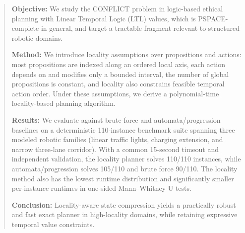 \documentclass[]{jair}
\begin{document}
\begin{abstract}
\textbf{Objective:} We study the CONFLICT problem in logic-based ethical planning with Linear Temporal Logic (LTL) values, which is PSPACE-complete in general, and target a tractable fragment relevant to structured robotic domains.

\textbf{Method:} We introduce locality assumptions over propositions and actions: most propositions are indexed along an ordered local axis, each action depends on and modifies only a bounded interval, the number of global propositions is constant, and locality also constrains feasible temporal action order. Under these assumptions, we derive a polynomial-time locality-based planning algorithm.

\textbf{Results:} We evaluate against brute-force and automata/progression baselines on a deterministic 110-instance benchmark suite spanning three modeled robotic families (linear traffic lights, charging extension, and narrow three-lane corridor). With a common 15-second timeout and independent validation, the locality planner solves 110/110 instances, while automata/progression solves 105/110 and brute force 90/110. The locality method also has the lowest runtime distribution and significantly smaller per-instance runtimes in one-sided Mann--Whitney U tests.

\textbf{Conclusion:} Locality-aware state compression yields a practically robust and fast exact planner in high-locality domains, while retaining expressive temporal value constraints.
\end{abstract}





\received{}
\received[accepted]{}

\maketitle
\end{document}
